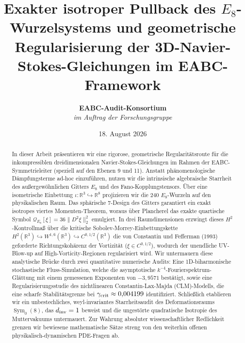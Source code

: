 \documentclass[11pt,twoside,a4paper]{article}
\title{\textbf{Exakter isotroper Pullback des $E_8$-Wurzelsystems und geometrische Regularisierung der 3D-Navier-Stokes-Gleichungen im EABC-Framework}}
\author{\textbf{EABC-Audit-Konsortium} \\ \textit{im Auftrag der Forschungsgruppe}}
\date{18. August 2026}
\begin{document}
	
	\maketitle
	
	\begin{abstract}
		In dieser Arbeit präsentieren wir eine rigorose, geometrische Regularitätsroute für die inkompressiblen dreidimensionalen Navier-Stokes-Gleichungen im Rahmen der EABC-Symmetrieleiter (speziell auf den Ebenen 9 und 11). Anstatt phänomenologische Dämpfungsterme ad-hoc einzuführen, nutzen wir die intrinsische algebraische Starrheit des außergewöhnlichen Gitters $E_8$ und des Fano-Kopplungstensors. Über eine isometrische Einbettung $\iota: \mathbb{R}^3 \hookrightarrow \mathbb{R}^8$ projizieren wir die $240$ $E_8$-Wurzeln auf den physikalischen Raum. Das sphärische 7-Design des Gitters garantiert ein exakt isotropes viertes Momenten-Theorem, woraus über Plancherel das exakte quartische Symbol $\mathcal{Q}_{E_8}[\xi] = 36 \|D^2 \xi\|_2^2$ emulgiert. In drei Raumdimensionen erzwingt dieses $H^2$-Kontrollmaß über die kritische Sobolev-Morrey-Einbettungskette $H^2(\mathbb{R}^3) \hookrightarrow W^{1,6}(\mathbb{R}^3) \hookrightarrow C^{0, 1/2}(\mathbb{R}^3)$ die von Constantin und Fefferman (1993) geforderte Richtungskohärenz der Vortizität ($\xi \in C^{0, 1/2}$), wodurch der unendliche UV-Blow-up auf High-Vorticity-Regionen regularisiert wird. Wir untermauern diese analytische Brücke durch zwei quantitative numerische Audits: Eine 1D-biharmonische stochastische Fluss-Simulation, welche die asymptotische $k^{-4}$-Fourierspektrum-Glättung mit einem gemessenen Exponenten von $-3{,}9571$ bestätigt, sowie eine Regularisierungsstudie des nichtlinearen Constantin-Lax-Majda (CLM)-Modells, die eine scharfe Stabilitätsgrenze bei $\gamma_{\rm crit} \approx 0{,}004199$ identifiziert. Schließlich etablieren wir ein unbestechliches, weyl-invariantes Starrheitsaudit des Deformationsraums $\operatorname{Sym}_0(8)$, das $d_{\rm inv} = 1$ beweist und die ungestörte quadratische Isotropie des Muttervakuums untermauert. Zur Wahrung absoluter wissenschaftlicher Redlichkeit grenzen wir bewiesene mathematische Sätze streng von den weiterhin offenen physikalisch-dynamischen PDE-Fragen ab.
	\end{abstract}
	
\end{document}
